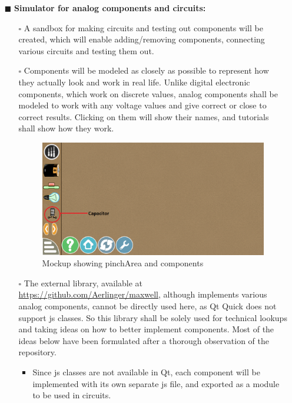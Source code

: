\documentclass[preprint,12pt]{elsarticle}
\begin{document}
\begin{itemize}
			\item[$\blacksquare$] \textbf{Simulator for analog components and circuits:}
				\begin{itemize}
				\item[$\square$] {A sandbox for making circuits and testing out components will be created, which will enable adding/removing components, connecting various circuits and testing them out.}
				\item[$\square$] {Components will be modeled as closely as possible to represent how they actually look and work in real life. Unlike digital electronic components, which work on discrete values, analog components shall be modeled to work with any voltage values and give correct or close to correct results. Clicking on them will show their names, and tutorials shall show how they work.}
				
				\begin{figure}[H]
				\centering\includegraphics[width=0.9\linewidth]{./images/gsoc4}
				\caption{Mockup showing pinchArea and components}
				\end{figure}
			
				\item[$\square$] {The external library, available at \href{https://github.com/Aerlinger/maxwell}{https://github.com/Aerlinger/maxwell}, although implements various analog components, cannot be directly used here, as Qt Quick does not support js classes. So this library shall be solely used for technical lookups and taking ideas on how to better implement components. Most of the ideas below have been formulated after a thorough observation of the repository.}
				
					\begin{itemize}
					\item {Since js classes are not available in Qt, each component will be implemented with its own separate js file, and exported as a module to be used in circuits.}
					

\end{itemize}
\end{itemize}
\end{itemize}
\end{document}
